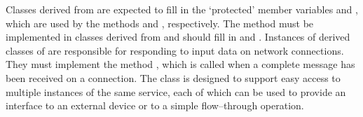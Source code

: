 Classes derived from  are expected to
fill in the `protected' member variables  and
, which are used by the methods
 and , respectively.
The method  must be implemented in classes derived from
 and should fill in
 and .
Instances of derived classes of
 are responsible for
responding to input data on \yarp{} network connections.
They must implement the method , which is called when a complete
message has been received on a connection.
The 
class is designed to support easy access to multiple instances of the same service, each
of which can be used to provide an interface to an external device or to a simple
flow--through operation.\\

